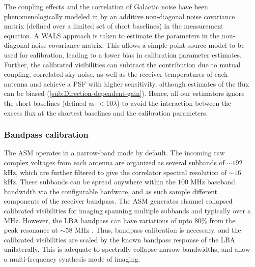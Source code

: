 \documentclass{aa}
\begin{document}
The  coupling  effects   and  the  correlation  of  Galactic   noise  have  been
phenomenologically   modeled  in   \citet{wijnholds2010self}   by  an   additive
non-diagonal  noise covariance  matrix  (defined  over a  limited  set of  short
baselines) in the measurement equation. A WALS approach is taken to estimate the
parameters in  the non-diagonal noise  covariance matrix.  This allows  a simple
point  source model  to be  used for  calibration, leading  to a  lower  bias in
calibration  parameter  estimates.   Further,  the calibrated  visibilities  can
subtract the contribution due to  mutual coupling, correlated sky noise, as well
as  the receiver  temperatures of  each antenna  and achieve  a PSF  with higher
sensitivity,    although    estimates    of    the   flux    can    be    biased
(\ref{sub:Direction-dependent-gain}).   Hence,  all  our estimators  ignore  the
short baselines (defined  as $<10\lambda$) to avoid the  interaction between the
excess flux at the shortest baselines and the calibration parameters.



\subsubsection{Bandpass calibration}

The ASM  operates in  a narrow-band  mode by default.  The incoming  raw complex
voltages from each antenna are organized as several subbands of $\sim$$192$ kHz,
which  are further  filtered to  give  the correlator  spectral resolution  of
$\sim$$16$  kHz. These  subbands can  be spread  anywhere within  the  $100$ MHz
baseband bandwidth via  the configurable hardware, and as  such sample different
components  of  the  receiver  bandpass.  The ASM  generates  channel  collapsed
calibrated  visibilities for  imaging spanning  multiple subbands  and typically
over a MHz. However, the LBA bandpass  can have variations of upto 80\% from the
peak  resonance   at  $\sim$$58$  MHz \citep{vanhaarlem2013lofar}. Thus,  bandpass
calibration  is necessary,  and the  calibrated visibilities  are scaled  by the
known bandpass response of the  LBA unilaterally. This is adequate to spectrally
collapse  narrow  bandwidths, and  allow  a  multi-frequency  synthesis mode  of
imaging.
\end{document}
